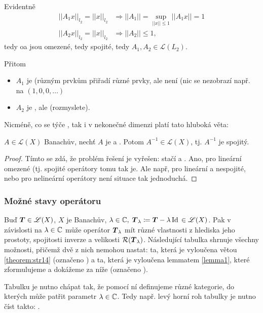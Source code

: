 Evidentně
\begin{equation*}
\begin{split}
  ||A_1x||_{l_2}=||x||_{l_2}&\Rightarrow ||A_1||=\sup\limits_{||x||\leq1}||A_1 x||=1\\
  ||A_2x||_{l_2}=||x||_{l_2}&\Rightarrow ||A_2||\leq1,
\end{split}
\end{equation*}
tedy oa jsou omezené, tedy spojité, tedy $A_1,A_2\in \mathscr{L}(L_2)$.

Přitom \begin{itemize}
    \item $A_1$ je  (různým prvkům přiřadí různé prvky, ale není  (nic se nezobrazí např. na $(1,0,0,\dots)$
    \item $A_2$ je , ale  (rozmyslete).
\end{itemize}

Nicméně, co se týče , tak i v nekonečné dimenzi platí tato hluboká věta:
\begin{theorem}
\label{theorem:str23}
$A\in \mathscr{L}(X)$ Banachův, nechť $A$ je  a . Potom $A^{-1}\in \mathscr{L}(X)$, tj. $A^{-1}$ je spojitý.
\end{theorem}

\begin{proof}
    Tímto se zdá, že problém  řešení je vyřešen: stačí  a . Ano, pro lineární omezené (tj. spojité operátory tomu tak je. Ale např, pro lineární a nespojité, nebo pro nelineární operátory není situace tak jednoduchá.
\end{proof}

\subsubsection{Možné stavy operátoru}
Buď $ \boldsymbol{T} \in\mathscr{L}(X)$, $X$ je Banachův, $\lambda\in\mathbb{C},\;  \boldsymbol{T}_\lambda\coloneqq  \boldsymbol{T} -\lambda\operatorname{Id}\, \in\mathscr{L}(X)$. Pak v závislosti na $\lambda\in\mathbb{C}$ může operátor $ \boldsymbol{T}_\lambda$ mít různé vlastnosti z hlediska jeho prostoty, spojitosti inverze a velikosti $\mathcal{R}( \boldsymbol{T}_\lambda)$. Následující tabulka shrnuje všechny možnosti, přičemž dvě z nich nemohou nastat: ta, která je vyloučena větou \ref{theorem:str14} (označeno ) a ta, která je vyloučena lemmatem \ref{lemma1}, které zformulujeme a dokážeme za níže (označeno ).

Tabulku je nutno chápat tak, že pomocí ní definujeme různé kategorie, do kterých může patřit parametr $\lambda\in\mathbb{C}$. Tedy např. levý horní roh tabulky je nutno číst takto: .

